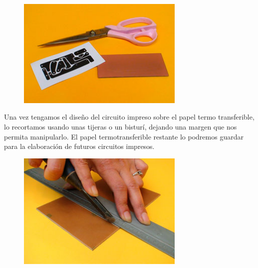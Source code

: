 \documentclass[12pt]{article}
\begin{document}

\begin{figure}[H]
	\begin{Center}
		\includegraphics[width=3.15in,height=2.07in]{./media/image10.jpeg}
	\end{Center}
\end{figure}



\par

Una vez tengamos el diseño del circuito impreso sobre el papel termo transferible, lo recortamos usando unas tijeras o un bisturí, dejando una margen que nos permita manipularlo. El papel termotransferible restante lo podremos guardar para la elaboración de futuros circuitos impresos.\par




\begin{figure}[H]
	\begin{Center}
		\includegraphics[width=3.15in,height=2.21in]{./media/image11.jpeg}
	\end{Center}
\end{figure}


\end{document}
